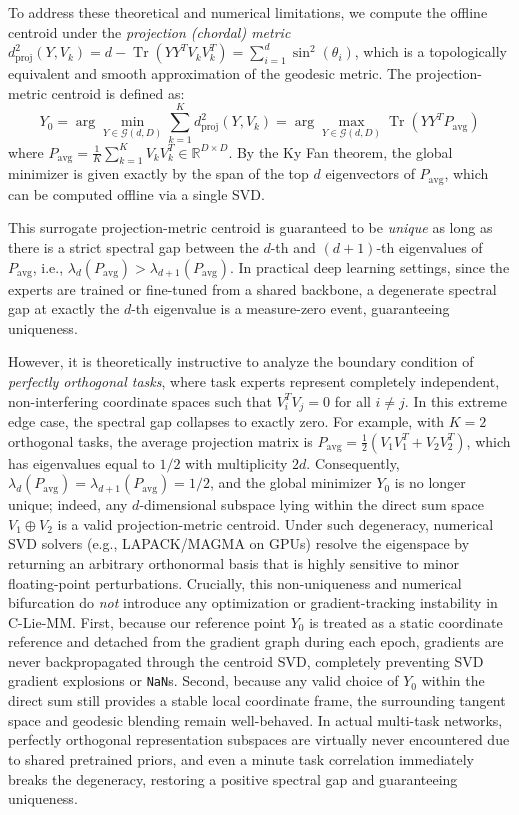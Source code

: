 To address these theoretical and numerical limitations, we compute the offline centroid under the \emph{projection (chordal) metric} $d_{\text{proj}}^2(Y, V_k) = d - \operatorname{Tr}(Y Y^T V_k V_k^T) = \sum_{i=1}^d \sin^2(\theta_i)$, which is a topologically equivalent and smooth approximation of the geodesic metric. The projection-metric centroid is defined as:
\begin{equation}
    Y_0 = \arg\min_{Y \in \mathcal{G}(d, D)} \sum_{k=1}^K d_{\text{proj}}^2(Y, V_k) = \arg\max_{Y \in \mathcal{G}(d, D)} \operatorname{Tr}\left( Y Y^T P_{\text{avg}} \right)
\end{equation}
where $P_{\text{avg}} = \frac{1}{K} \sum_{k=1}^K V_k V_k^T \in \mathbb{R}^{D \times D}$. By the Ky Fan theorem, the global minimizer is given exactly by the span of the top $d$ eigenvectors of $P_{\text{avg}}$, which can be computed offline via a single SVD. 

This surrogate projection-metric centroid is guaranteed to be \emph{unique} as long as there is a strict spectral gap between the $d$-th and $(d+1)$-th eigenvalues of $P_{\text{avg}}$, i.e., $\lambda_d(P_{\text{avg}}) > \lambda_{d+1}(P_{\text{avg}})$. In practical deep learning settings, since the experts are trained or fine-tuned from a shared backbone, a degenerate spectral gap at exactly the $d$-th eigenvalue is a measure-zero event, guaranteeing uniqueness.

However, it is theoretically instructive to analyze the boundary condition of \emph{perfectly orthogonal tasks}, where task experts represent completely independent, non-interfering coordinate spaces such that $V_i^T V_j = 0$ for all $i \neq j$. In this extreme edge case, the spectral gap collapses to exactly zero. For example, with $K=2$ orthogonal tasks, the average projection matrix is $P_{\text{avg}} = \frac{1}{2}(V_1 V_1^T + V_2 V_2^T)$, which has eigenvalues equal to $1/2$ with multiplicity $2d$. Consequently, $\lambda_d(P_{\text{avg}}) = \lambda_{d+1}(P_{\text{avg}}) = 1/2$, and the global minimizer $Y_0$ is no longer unique; indeed, any $d$-dimensional subspace lying within the direct sum space $V_1 \oplus V_2$ is a valid projection-metric centroid. Under such degeneracy, numerical SVD solvers (e.g., LAPACK/MAGMA on GPUs) resolve the eigenspace by returning an arbitrary orthonormal basis that is highly sensitive to minor floating-point perturbations. Crucially, this non-uniqueness and numerical bifurcation do \emph{not} introduce any optimization or gradient-tracking instability in C-Lie-MM. First, because our reference point $Y_0$ is treated as a static coordinate reference and detached from the gradient graph during each epoch, gradients are never backpropagated through the centroid SVD, completely preventing SVD gradient explosions or \texttt{NaN}s. Second, because any valid choice of $Y_0$ within the direct sum still provides a stable local coordinate frame, the surrounding tangent space and geodesic blending remain well-behaved. In actual multi-task networks, perfectly orthogonal representation subspaces are virtually never encountered due to shared pretrained priors, and even a minute task correlation immediately breaks the degeneracy, restoring a positive spectral gap and guaranteeing uniqueness.

